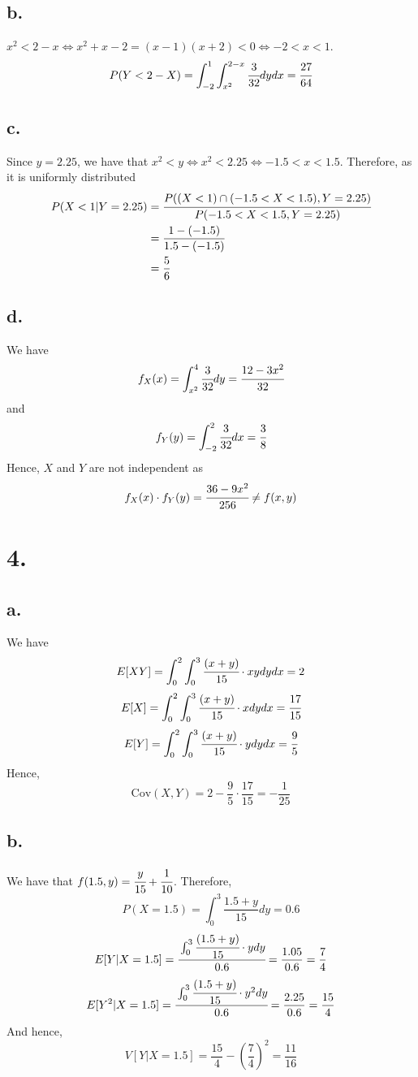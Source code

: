\documentclass[11pt]{article}
\begin{document}
\subsection*{b.}
$x^2 < 2 - x \iff x^2+x-2=(x-1)(x+2) < 0 \iff -2<x<1$.
\[
    P(Y<2-X) = \int_{-2}^1 \int_{x^2}^{2-x} \cfrac{3}{32} dy dx = \cfrac{27}{64}
\]
\subsection*{c.}
Since $y= 2.25$, we have that $x^2<y \iff x^2 < 2.25 \iff -1.5 < x < 1.5$. Therefore, as it is uniformly distributed 
\begin{equation*}
    \begin{aligned}
        P(X<1 | Y = 2.25) &= \cfrac{P((X<1) \cap (-1.5 < X < 1.5), Y=2.25)}{P(-1.5 < X < 1.5,Y=2.25)} \\
        &= \frac{1 - (-1.5)}{1.5-(-1.5)}  \\
        &= \frac{5}{6}
    \end{aligned}
\end{equation*}
\subsection*{d.}
We have
\[
    f_X(x) = \int_{x^2}^4 \cfrac{3}{32} dy = \cfrac{12-3x^2}{32}
\]
and
\[
    f_Y(y) = \int_{-2}^2 \cfrac{3}{32} dx = \cfrac{3}{8}    
\]
Hence, $X$ and $Y$ are not independent as 
\[
    f_X(x) \cdot f_Y(y) = \cfrac{36-9x^2}{256} \ne f(x,y)    
\]
\pagebreak
\section*{4.}
\subsection*{a.}
We have
\[
    E[XY] = \int_0^2 \int_0^3 \cfrac{(x+y)}{15} \cdot xy dy dx = 2
\]
\[
    E[X] = \int_0^2 \int_0^3 \cfrac{(x+y)}{15} \cdot x dy dx = \cfrac{17}{15}
\]
\[
    E[Y] = \int_0^2 \int_0^3 \cfrac{(x+y)}{15} \cdot y dy dx = \cfrac{9}{5}
\]
Hence, 
\[
    \text{Cov}(X,Y) = 2 - \frac{9}{5} \cdot \frac{17}{15} = - \frac{1}{25}
\]
\subsection*{b.}
We have that $f(1.5, y) = \cfrac{y}{15} + \cfrac{1}{10}$. Therefore, 
\[
    P(X=1.5) = \int_0^3 \frac{1.5 + y}{15} dy = 0.6
\]
\[
    E[Y | X = 1.5] = \cfrac{\int_0^3 \cfrac{(1.5+y)}{15} \cdot y dy}{0.6} = \frac{1.05}{0.6} = \frac{7}{4}
\]
\[
    E[Y^2 | X = 1.5] = \cfrac{\int_0^3 \cfrac{(1.5+y)}{15} \cdot y^2 dy}{0.6} = \frac{2.25}{0.6} = \frac{15}{4}  
\]
And hence, 
\[
    V[Y | X = 1.5] = \frac{15}{4} - \left(\frac{7}{4} \right)^2 = \frac{11}{16} 
\]
\pagebreak
\end{document}
